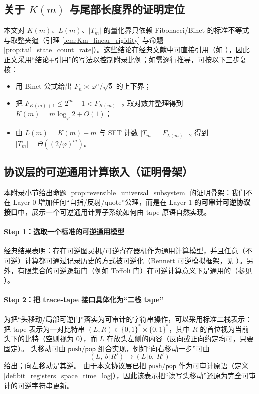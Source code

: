 \subsection{关于 \texorpdfstring{$K(m)$}{K(m)} 与尾部长度界的证明定位}\label{app:Km_binet_notes}
本文对 \(K(m)\)、\(L(m)\)、\(|T_m|\) 的量化界只依赖 Fibonacci/Binet 的标准不等式与取整夹逼（引理 \ref{lem:Km_linear_rigidity} 与命题 \ref{prop:tail_state_count_rate}）。这些结论在经典文献中可直接引用（如 \cite{Koshy2001}），因此正文采用“结论+引用”的写法以控制附录比例；如需逐行推导，可按以下三步复核：
\begin{itemize}
  \item 用 Binet 公式给出 \(F_n\asymp \varphi^n/\sqrt5\) 的上下界；
  \item 把 \(F_{K(m)+1}\le 2^m-1< F_{K(m)+2}\) 取对数并整理得到 \(K(m)=m\log_\varphi 2+O(1)\)；
  \item 由 \(L(m)=K(m)-m\) 与 SFT 计数 \(|T_m|=F_{L(m)+2}\) 得到 \(|T_m|=\Theta((2/\varphi)^m)\)。
\end{itemize}

\subsection{协议层的可逆通用计算嵌入（证明骨架）}\label{app:reversible_universal_computation}
本附录小节给出命题 \ref{prop:reversible_universal_subsystem} 的证明骨架：我们不在 Layer 0 增加任何“自指/反射/quote”公理，而是在 Layer 1 的\textbf{可审计可逆协议接口}中，展示一个可逆通用计算子系统如何由 tape 原语自然实现。

\paragraph{Step 1：选取一个标准的可逆通用模型}
经典结果表明：存在可逆图灵机/可逆寄存器机作为通用计算模型，并且任意（不可逆）计算都可通过记录历史的方式被可逆化（Bennett 可逆模拟框架，见 \cite{Bennett1973}）。另外，有限集合的可逆逻辑门（例如 Toffoli 门）在可逆计算意义下是通用的（参见 \cite{Toffoli1980}）。

\paragraph{Step 2：把 trace-tape 接口具体化为“二栈 tape”}
为把“头移动/局部可逆门”落实为可审计的字符串操作，可以采用标准二栈表示：把 tape 表示为一对比特串 \((L,R)\in\{0,1\}^\ast\times\{0,1\}^\ast\)，其中 \(R\) 的首位视为当前头下的比特（空则视为 \(0\)），而 \(L\) 存放头左侧的内容（反向或正向约定均可，只要固定）。
头移动可由 \(\mathsf{push}/\mathsf{pop}\) 组合实现，例如“向右移动一步”可由
$$
(L,\ b\Vert R')\mapsto (L\Vert b,\ R')
$$
给出；向左移动是其逆。
由于本文协议层已把 \(\mathsf{push}/\mathsf{pop}\) 作为可审计原语（定义 \ref{def:bit_registers_space_time_log}），因此该表示把“读写头移动”还原为完全可审计的可逆字符串更新。

